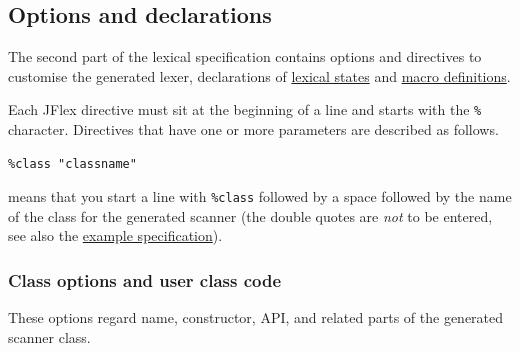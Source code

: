 \subsection{Options and declarations}\label{options-and-declarations}

The second part of the lexical specification contains options and
directives to customise the generated lexer, declarations of
\hyperref[StateDecl]{lexical states} and \hyperref[MacroDefs]{macro
definitions}.

Each JFlex directive must sit at the beginning of a line and starts with
the \texttt{\%} character. Directives that have one or more parameters
are described as follows.

\begin{verbatim}
%class "classname"
\end{verbatim}

means that you start a line with \texttt{\%class} followed by a space
followed by the name of the class for the generated scanner (the double
quotes are \emph{not} to be entered, see also the
\hyperref[Example]{example specification}).

\subsubsection{Class options and user class code}\label{ClassOptions}

These options regard name, constructor, API, and related parts of the
generated scanner class.

